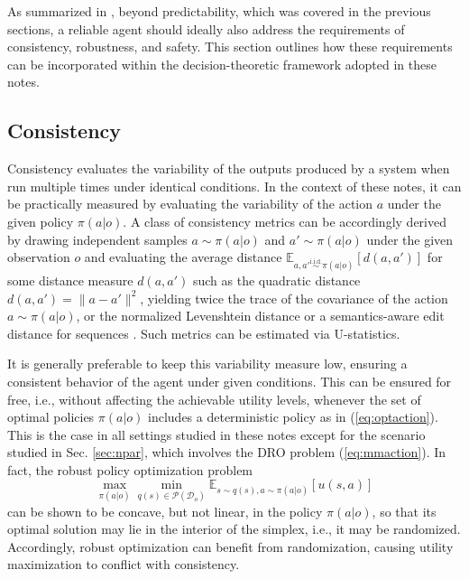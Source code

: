 \documentclass[journal]{IEEEtran}
\theoremstyle{definition}
\theoremstyle{remark}
\newcommand{\E}{\mathbb{E}}
\newcommand{\Dset}{\mathcal{D}}
\newcommand{\Pset}{\mathcal{P}}
\begin{document}
{%

As summarized in \cite{rabanser2026towards}, beyond predictability, which was covered in the previous sections, a reliable agent should ideally also address the requirements of consistency, robustness, and safety. This section outlines how these requirements can be incorporated within the decision-theoretic framework adopted in these notes.

\subsection{Consistency}
Consistency evaluates the variability of the outputs produced by a system when run multiple times under identical conditions. In the context of these notes, it can be practically measured by evaluating the variability of the action $a$ under the given policy $\pi(a|o)$. A class of consistency metrics can be accordingly derived by drawing independent samples $a\sim \pi(a|o)$ and $a'\sim \pi(a|o)$ under the given observation $o$ and evaluating the average distance $\mathbb{E}_{a,a'\stackrel{\text{i.i.d.}}{\sim} \pi(a|o)}[d(a,a')]$ for some distance measure $d(a,a')$ such as the quadratic distance $d(a,a')=\|a-a'\|^2$, yielding twice the trace of the covariance of the action $a\sim \pi(a|o)$, or the normalized Levenshtein distance or a semantics-aware edit distance for sequences \cite{rabanser2026towards}. Such metrics can be estimated via U-statistics.

It is generally preferable to keep this variability measure low, ensuring a consistent behavior of the agent under given conditions. This can be ensured for free, i.e., without affecting the achievable utility levels, whenever the set of optimal policies $\pi(a|o)$ includes a deterministic policy as in (\ref{eq:optaction}). This is the case in all settings studied in these notes except for the scenario studied in Sec. \ref{sec:npar}, which involves the DRO problem (\ref{eq:mmaction}). In fact, the robust policy optimization problem
\begin{equation} \max_{\pi(a|o)} \min_{q(s)\in \Pset(\Dset_o)} \E_{s\sim q(s),a\sim \pi(a|o)}[u(s,a)]\end{equation}
can be shown to be concave, but not linear, in the policy $\pi(a|o)$, so that its optimal solution may lie in the interior of the simplex, i.e., it may be randomized. Accordingly, robust optimization can benefit from randomization, causing utility maximization to conflict with consistency.

}
\end{document}
